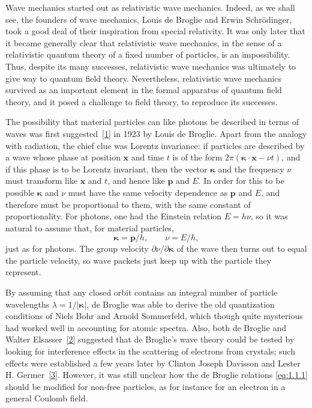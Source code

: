 Wave mechanics started out as relativistic wave mechanics. Indeed, as
we shall see, the founders of wave mechanics, Louis de Broglie and
Erwin Schr\"odinger, took a good deal of their inspiration from special
relativity. It was only later that it became generally clear that relativistic
wave mechanics, in the sense of a relativistic quantum theory of a fixed
number of particles, is an impossibility. Thus, despite its many successes,
relativistic wave mechanics was ultimately to give way to quantum field
theory. Nevertheless, relativistic wave mechanics survived as an important
element in the formal apparatus of quantum field theory, and it posed a
challenge to field theory, to reproduce its successes.

The possibility that material particles can like photons be described in
terms of waves was first suggested~\hyperref[ref:1.1]{[1]} in 1923 by Louis de Broglie. Apart
from the analogy with radiation, the chief clue was Lorentz invariance: if
particles are described by a wave whose phase at position $\mathbf{x}$ and time $t$
is of the form $2\pi(\boldsymbol{\kappa}\cdot\mathbf{x}-\nu t)$, and if this phase is to be Lorentz invariant,
then the vector $\boldsymbol{\kappa}$ and the frequency $\nu$ must transform like $\mathbf{x}$ and $t$, and
hence like $\mathbf{p}$ and $E$. In order for this to be possible $\boldsymbol{\kappa}$ and $\nu$ must have the
same velocity dependence as $\mathbf{p}$ and $E$, and therefore must be proportional
to them, with the same constant of proportionality. For photons, one had
the Einstein relation $E=h\nu$, so it was natural to assume that, for material
particles,
\begin{equation}
  \boldsymbol{\kappa}=\mathbf{p}/h,
  \qquad
  \nu=E/h,
  \tag{1.1.1}\label{eq:1.1.1}
\end{equation}
just as for photons. The group velocity $\partial\nu/\partial\boldsymbol{\kappa}$ of the wave then turns
out to equal the particle velocity, so wave packets just keep up with the
particle they represent.

By assuming that any closed orbit contains an integral number of
particle wavelengths $\lambda=1/|\boldsymbol{\kappa}|$, de Broglie was able to derive the old
quantization conditions of Niels Bohr and Arnold Sommerfeld, which
though quite mysterious had worked well in accounting for atomic spectra.
Also, both de Broglie and Walter Elsasser~\hyperref[ref:1.2]{[2]} suggested that de Broglie's
wave theory could be tested by looking for interference effects in the
scattering of electrons from crystals; such effects were established a few
years later by Clinton Joseph Davisson and Lester H. Germer~\hyperref[ref:1.3]{[3]}. However,
it was still unclear how the de Broglie relations \eqref{eq:1.1.1} should be modified
for non-free particles, as for instance for an electron in a general Coulomb
field.

